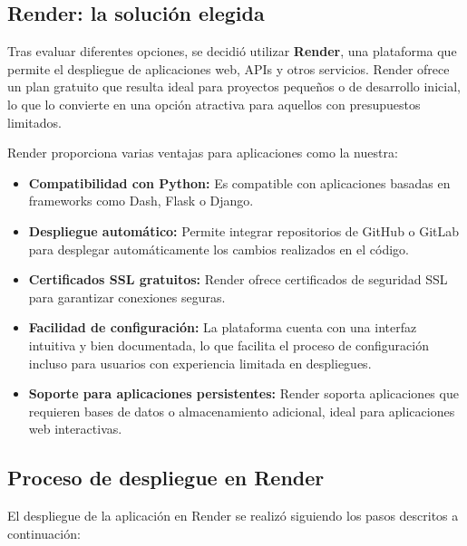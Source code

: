 \subsection{Render: la solución elegida}

Tras evaluar diferentes opciones, se decidió utilizar \textbf{Render}, una plataforma que permite el despliegue de aplicaciones web, APIs y otros servicios. Render ofrece un plan gratuito que resulta ideal para proyectos pequeños o de desarrollo inicial, lo que lo convierte en una opción atractiva para aquellos con presupuestos limitados.

Render proporciona varias ventajas para aplicaciones como la nuestra:
\begin{itemize}
    \item \textbf{Compatibilidad con Python:} Es compatible con aplicaciones basadas en frameworks como Dash, Flask o Django.
    \item \textbf{Despliegue automático:} Permite integrar repositorios de GitHub o GitLab para desplegar automáticamente los cambios realizados en el código.
    \item \textbf{Certificados SSL gratuitos:} Render ofrece certificados de seguridad SSL para garantizar conexiones seguras.
    \item \textbf{Facilidad de configuración:} La plataforma cuenta con una interfaz intuitiva y bien documentada, lo que facilita el proceso de configuración incluso para usuarios con experiencia limitada en despliegues.
    \item \textbf{Soporte para aplicaciones persistentes:} Render soporta aplicaciones que requieren bases de datos o almacenamiento adicional, ideal para aplicaciones web interactivas.
\end{itemize}

\subsection{Proceso de despliegue en Render}

El despliegue de la aplicación en Render se realizó siguiendo los pasos descritos a continuación:

